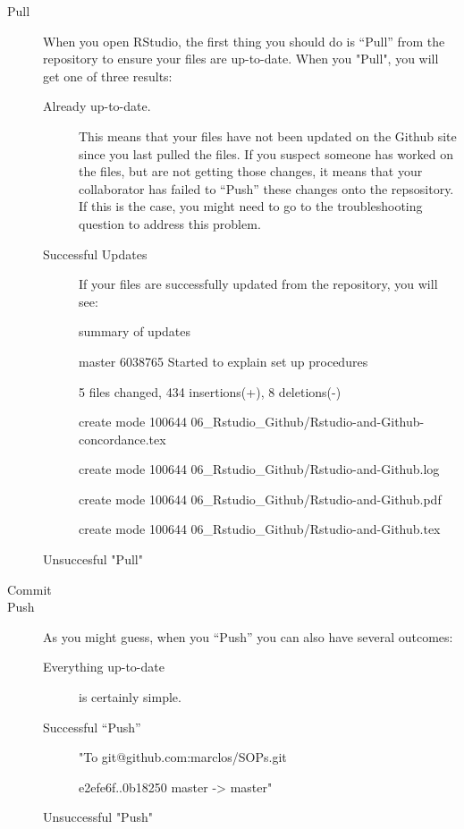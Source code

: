 \documentclass[12pt]{../SOP3_beta}
\begin{document}
\begin{description}
  \item[Pull] When you open RStudio, the first thing you should do is ``Pull'' from the repository to ensure your files are up-to-date. When you "Pull", you will get one of three results:
  
  \begin{description}
  \item[Already up-to-date.] This means that your files have not been updated on the Github site since you last pulled the files. If you suspect someone has worked on the files, but are not getting those changes, it means that your collaborator has failed to ``Push'' these changes onto the repsository. If this is the case, you might need to go to the troubleshooting question to address this problem.
  \item[Successful Updates] If your files are successfully updated from the repository, you will see:
  
summary of updates

master 6038765 Started to explain set up procedures
 
 5 files changed, 434 insertions(+), 8 deletions(-)
 
 create mode 100644 06\_Rstudio\_Github/Rstudio-and-Github-concordance.tex
 
 create mode 100644 06\_Rstudio\_Github/Rstudio-and-Github.log
 
 create mode 100644 06\_Rstudio\_Github/Rstudio-and-Github.pdf
 
 create mode 100644 06\_Rstudio\_Github/Rstudio-and-Github.tex
 
 \item[Unsuccesful "Pull"]
 
 
\end{description}

  \item[Commit]
  \item[Push] As you might guess, when you ``Push'' you can also have several outcomes:
\begin{description}
  \item[Everything up-to-date] is certainly simple.   \item[Successful ``Push'']
  
    "To git@github.com:marclos/SOPs.git
  
   e2efe6f..0b18250  master -> master"
   \item[Unsuccessful "Push"]
\end{description}
  

\end{description}
\end{document}
